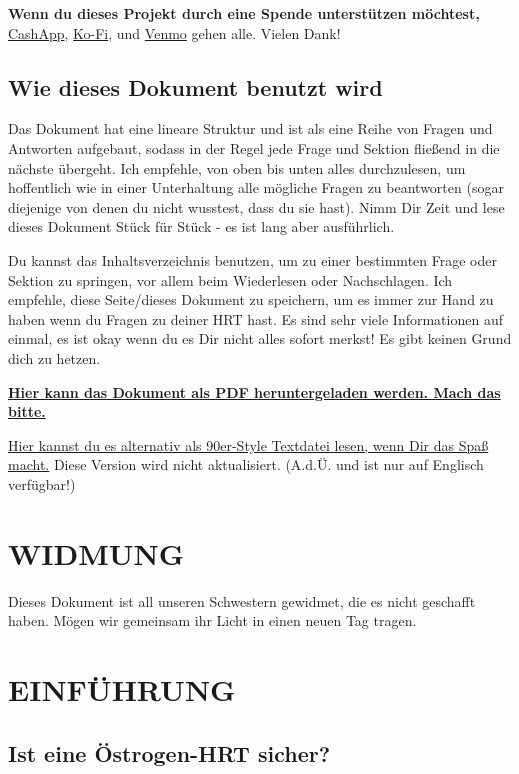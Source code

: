 \documentclass{article}
\begin{document}
\textbf{Wenn du dieses Projekt durch eine Spende unterstützen möchtest,} \href{https://cash.app/Katitties}{CashApp}, \href{https://ko-fi.com/katitties}{Ko-Fi}, und \href{https://account.venmo.com/u/katitties}{Venmo} gehen alle. Vielen Dank!

\subsection*{Wie dieses Dokument benutzt wird}

Das Dokument hat eine lineare Struktur und ist als eine Reihe von Fragen und Antworten aufgebaut, sodass in der Regel jede Frage und Sektion fließend in die nächste übergeht. Ich empfehle, von oben bis unten alles durchzulesen, um hoffentlich wie in einer Unterhaltung alle mögliche Fragen zu beantworten (sogar diejenige von denen du nicht wusstest, dass du sie hast). Nimm Dir Zeit und lese dieses Dokument Stück für Stück - es ist lang aber ausführlich.

Du kannst das Inhaltsverzeichnis benutzen, um zu einer bestimmten Frage oder Sektion zu springen, vor allem beim Wiederlesen oder Nachschlagen. Ich empfehle, diese Seite/dieses Dokument zu speichern, um es immer zur Hand zu haben wenn du Fragen zu deiner HRT hast. Es sind sehr viele Informationen auf einmal, es ist okay wenn du es  Dir nicht alles sofort merkst! Es gibt keinen Grund dich zu hetzen. 

\noindent\textbf{\href{PDF_LINK}{Hier kann das Dokument als PDF heruntergeladen werden. Mach das bitte.}}

\noindent\href{https://pghrt.diy/pghrtgretchensversion.txt}{Hier kannst du es alternativ als 90er-Style Textdatei lesen, wenn Dir das Spaß macht.} Diese Version wird nicht aktualisiert. (A.d.Ü. und ist nur auf Englisch verfügbar!)

\section*{WIDMUNG}

Dieses Dokument ist all unseren Schwestern gewidmet, die es nicht geschafft haben. Mögen wir gemeinsam ihr Licht in einen neuen Tag tragen.
 

\section{EINFÜHRUNG}

\subsection{Ist eine Östrogen-HRT sicher?}
\end{document}
